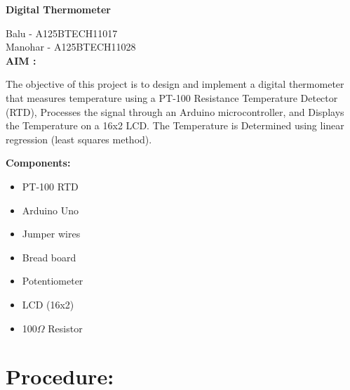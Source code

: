 \documentclass[journal]{IEEEtran}
\begin{document}
\begin{center}
\textbf{\Large Digital Thermometer}
\end{center}

\hfill Balu - A125BTECH11017 \\
\hfill Manohar - A125BTECH11028 \\[1cm]

\textbf{AIM :}

The objective of this project is to design and implement a digital thermometer that
measures temperature using a PT-100 Resistance Temperature Detector (RTD), Processes
the signal through an Arduino microcontroller, and Displays the Temperature on a 16x2
LCD. The Temperature is Determined using linear regression (least squares method).

\vspace{1cm}

\textbf{Components:}
\begin{itemize}
    \item PT-100 RTD
    \item Arduino Uno
    \item Jumper wires
    \item Bread board
    \item Potentiometer
    \item LCD (16x2)
    \item 100$\Omega$ Resistor
\end{itemize}
\section*{Procedure:}
\end{document}
